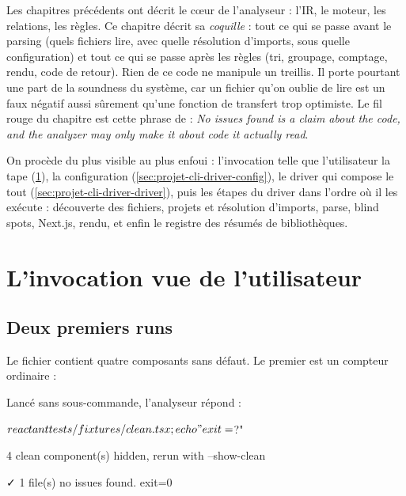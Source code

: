 Les chapitres précédents ont décrit le cœur de l'analyseur : l'IR, le moteur, les relations, les règles. Ce chapitre décrit sa \emph{coquille} : tout ce qui se passe avant le parsing (quels fichiers lire, avec quelle résolution d'imports, sous quelle configuration) et tout ce qui se passe après les règles (tri, groupage, comptage, rendu, code de retour). Rien de ce code ne manipule un treillis. Il porte pourtant une part de la soundness du système, car un fichier qu'on oublie de lire est un faux négatif aussi sûrement qu'une fonction de transfert trop optimiste. Le fil rouge du chapitre est cette phrase de  : \og \emph{\og No issues found\fg{} is a claim about the code, and the analyzer may only make it about code it actually read}\fg{}.

On procède du plus visible au plus enfoui : l'invocation telle que l'utilisateur la tape (\cref{sec:projet-cli-driver-invocation}), la configuration (\cref{sec:projet-cli-driver-config}), le driver qui compose le tout (\cref{sec:projet-cli-driver-driver}), puis les étapes du driver dans l'ordre où il les exécute : découverte des fichiers, projets et résolution d'imports, parse, blind spots, Next.js, rendu, et enfin le registre des résumés de bibliothèques.

\section{L'invocation vue de l'utilisateur}
\label{sec:projet-cli-driver-invocation}

\subsection{Deux premiers runs}

Le fichier  contient quatre composants sans défaut. Le premier est un compteur ordinaire :


Lancé sans sous-commande, l'analyseur répond :

\begin{shell}
$ reactant tests/fixtures/clean.tsx ; echo "exit=$?"
\end{shell}
\begin{sortie}
   4 clean component(s) hidden, rerun with --show-clean

✓  1 file(s) no issues found.
exit=0
\end{sortie}

